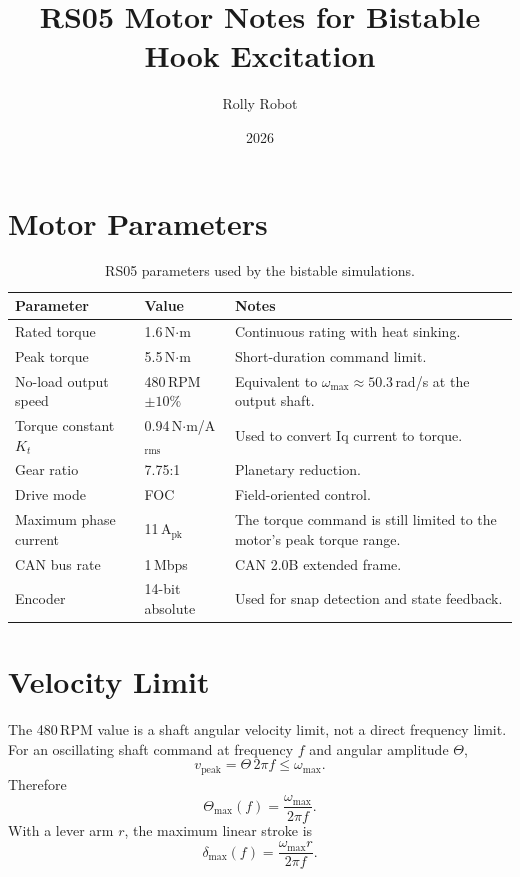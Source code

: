 \documentclass[11pt,letterpaper]{article}
\title{\textbf{RS05 Motor Notes for Bistable Hook Excitation}}
\author{Rolly Robot}
\date{2026}
\begin{document}
\maketitle

\section{Motor Parameters}

\begin{table}[h]
\centering
\caption{RS05 parameters used by the bistable simulations.}
\renewcommand{\arraystretch}{1.25}
\begin{tabular}{p{3.6cm} p{3.2cm} p{6.4cm}}
\toprule
\textbf{Parameter} & \textbf{Value} & \textbf{Notes} \\
\midrule
Rated torque & 1.6\,N$\cdot$m & Continuous rating with heat sinking. \\
Peak torque & 5.5\,N$\cdot$m & Short-duration command limit. \\
No-load output speed & 480\,RPM $\pm10\%$ & Equivalent to $\omega_{\max}\approx50.3$\,rad/s at the output shaft. \\
Torque constant $K_t$ & 0.94\,N$\cdot$m/A$_{\mathrm{rms}}$ & Used to convert Iq current to torque. \\
Gear ratio & 7.75:1 & Planetary reduction. \\
Drive mode & FOC & Field-oriented control. \\
Maximum phase current & 11\,A$_{\mathrm{pk}}$ & The torque command is still limited to the motor's peak torque range. \\
CAN bus rate & 1\,Mbps & CAN 2.0B extended frame. \\
Encoder & 14-bit absolute & Used for snap detection and state feedback. \\
\bottomrule
\end{tabular}
\end{table}

\section{Velocity Limit}

The 480\,RPM value is a shaft angular velocity limit, not a direct frequency
limit. For an oscillating shaft command at frequency $f$ and angular amplitude
$\Theta$,
\begin{equation}
  v_{\mathrm{peak}}=\Theta\,2\pi f \leq \omega_{\max}.
\end{equation}
Therefore
\begin{equation}
  \Theta_{\max}(f)=\frac{\omega_{\max}}{2\pi f}.
\end{equation}
With a lever arm $r$, the maximum linear stroke is
\begin{equation}
  \delta_{\max}(f)=\frac{\omega_{\max}r}{2\pi f}.
\end{equation}
\end{document}
